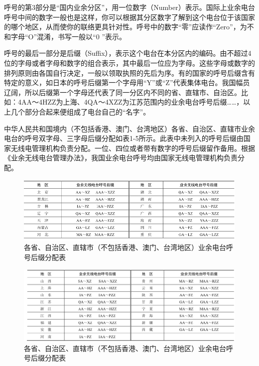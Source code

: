 \documentclass[12pt,UTF8]{ctexbook}
\begin{document}
呼号的第3部分是“国内业余分区”，用一位数字（Number）表示。国际上业余电台呼号中间的数字一般也是这样，你可以根据其分区数字了解到这个电台位于该国家的哪个地区，从而使你的联络更具针对性。呼号中的数字“零”应读作“Zero”，为不和字母“O”混淆，书写一般以“0 ”表示。

呼号的最后一部分是后缀（Suffix），表示这个电台在本分区内的编码。由不超过4位的字母或者字母和数字的组合表示，其中最后一位应为字母。这些字母或数字的排列原则由各国自行决定，一般以领取执照的先后为序。有的国家的呼号后缀含有特定的意义，如日本的呼号后缀第一个字母用“Y”或“Z”代表集体电台。我国幅员辽阔，所以后缀第一个字母还代表了同一分区内不同的省、直辖市、自治区。比如：4AA～4HZZ为上海、4QA～4XZZ为江苏范围内的业余电台呼号后缀……，以上几个部分合起来便组成了电台自己的“名字”。

中华人民共和国境内（不包括香港、澳门、台湾地区）各省、自治区、直辖市业余电台的呼号双字母、三字母后缀分配如表1-5所示。此表中未列入的呼号后缀由国家无线电管理机构负责分配。一位、四位或者带有数字的呼号后缀留作备用。根据《业余无线电台管理办法》，我国业余电台呼号均由国家无线电管理机构负责分配。

\begin{figure}[htbp]
	\centering
	\includegraphics[width=0.7\linewidth]{84}
	\caption{各省、自治区、直辖市（不包括香港、澳门、台湾地区）业余电台呼号后缀分配表}
	\label{fig:1}
\end{figure}

\begin{figure}[htbp]
	\centering
	\includegraphics[width=0.7\linewidth]{85}
	\caption{各省、自治区、直辖市（不包括香港、澳门、台湾地区）业余电台呼号后缀分配表}
	\label{fig:1}
\end{figure}
\end{document}
